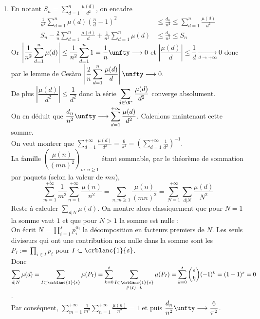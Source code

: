 \documentclass[8pt]{book}
\begin{document}
\begin{enumerate}[leftmargin=*]
		\item En notant $S_n=\displaystyle\sum_{d=1}^n\frac{\mu(d)}{d^2}$, on encadre
		\begin{align*}
			\frac{1}{n^2}\sum_{d=1}^n\mu(d)\left(\frac{n}{d}-1\right)^2&\leq \frac{d_n}{n^2}\leq \sum_{d=1}^n\frac{\mu(d)}{d^2}\\
			S_n-\frac{2}{n}\sum_{d=1}^n\frac{\mu(d)}{d}+\frac{1}{n^2}\sum_{d=1}^n\mu(d)&\leq \frac{d_n}{n^2}\leq S_n
		\end{align*}
		Or $\displaystyle\left|\frac{1}{n^2}\sum_{d=1}^n\mu(d)\right|\leq \frac{1}{n^2}\sum_{d=1}^n1=\frac{1}{n}\unfty\longrightarrow 0$ et $\left|\dfrac{\mu(d)}{d}\right|\leq \dfrac{1}{d}\underset{d\to +\infty}\longrightarrow 0$ donc par le lemme de Cesàro $\displaystyle\left|\frac{2}{n}\sum_{d=1}^n\frac{\mu(d)}{d}\right|\unfty\longrightarrow 0$.\\
		De plus $\left|\dfrac{\mu(d)}{d^2}\right|\leq \dfrac{1}{d^2}$ donc la série $\displaystyle\sum_{d\in \N^*}\frac{\mu(d)}{d^2}$ converge absolument.\\
		On en déduit que $\displaystyle\frac{d_n}{n^2}\unfty\longrightarrow\sum_{d=1}^{+\infty}\frac{\mu(d)}{d^2}$. Calculons maintenant cette somme.\\
		On veut montrer que $\displaystyle\sum_{d=1}^{+\infty}\frac{\mu(d)}{d^2}=\frac{6}{\pi^2}=\left(\sum_{d=1}^{+\infty}\frac{1}{d^2}\right)^{-1}$.\\
		La famille $\left(\dfrac{\mu(n)}{(mn)^2}\right)_{m,n\geq 1}$ étant sommable, par le théorème de sommation par paquets (selon la valeur de $mn$), $$\sum_{m=1}^{+\infty}\frac{1}{m^2}\sum_{n=1}^{+\infty}\frac{\mu(n)}{n^2}=\sum_{n,m\geq 1}\frac{\mu(n)}{(mn)^2}=\sum_{N=1}^{+\infty}\sum_{d|N}\frac{\mu(d)}{N^2}$$
		Reste à calculer $\displaystyle\sum_{d|N}\mu(d)$. On montre alors classiquement que pour $N=1$ la somme vaut $1$ et que pour $N>1$ la somme est nulle :\\
		On écrit $N=\displaystyle\prod_{i=1}^sp_i^{\alpha_i}$ la décomposition en facteurs premiers de $N$. Les seuls diviseurs qui ont une contribution non nulle dans la somme sont les $P_I:=\displaystyle\prod_{i\in I}p_i$ pour $I\subset \crblanc{1}{s}$.\\
		Donc $\displaystyle\sum_{d|N}\mu(d)=\sum_{I\subset \crblanc{1}{s}}\mu(P_I)=\sum_{k=0}^s\sum_{\substack{I\subset \crblanc{1}{s}\\\#(I)=k}}\mu(P_I)=\sum_{k=0}^s\binom{s}{k}(-1)^k=(1-1)^s=0$.\\
		Par conséquent, $\displaystyle\sum_{m=1}^{+\infty}\frac{1}{m^2}\sum_{n=1}^{+\infty}\frac{\mu(n)}{n^2}=1$ et puis $\dfrac{d_n}{n^2}\unfty\longrightarrow\dfrac{6}{\pi^2}$.\\

\end{enumerate}
\end{document}
